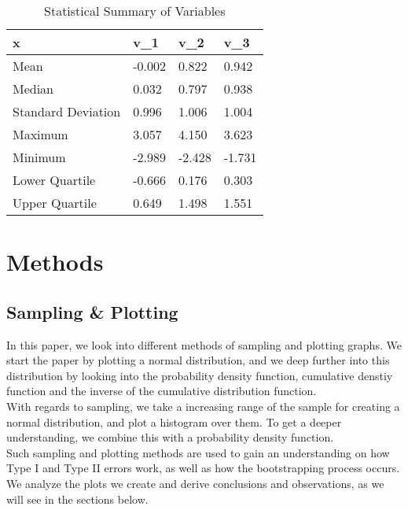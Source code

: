 \documentclass[a4paper,twocolumn]{article}
\begin{document}
\begin{table}[htbp]
    \centering
    \renewcommand{\arraystretch}{1.2} 
    \begin{tabular}{|l|p{1cm}|p{1cm}|p{1cm}|} 
        \hline
        \textbf{x} & \textbf{v\_1} & \textbf{v\_2} & \textbf{v\_3} \\
        \hline
        Mean                & -0.002  & 0.822  & 0.942  \\
        Median              & 0.032   & 0.797  & 0.938  \\
        Standard Deviation  & 0.996   & 1.006  & 1.004  \\
        Maximum             & 3.057   & 4.150  & 3.623  \\
        Minimum             & -2.989  & -2.428 & -1.731 \\
        Lower Quartile      & -0.666  & 0.176  & 0.303  \\
        Upper Quartile      & 0.649   & 1.498  & 1.551  \\
        \hline
    \end{tabular}
    \caption{Statistical Summary of Variables}
    \label{tab:summary}
\end{table}

\section{Methods}

\subsection{Sampling \& Plotting}
In this paper, we look into different methods of sampling and plotting graphs. We start the paper by plotting a 
normal distribution, and we deep further into this distribution by looking into the probability density function, 
cumulative denstiy function and the inverse of the cumulative distribution function. \\

With regards to sampling, we take a increasing range of the sample for creating a normal distribution, and plot 
a histogram over them. To get a deeper understanding, we combine this with a probability density function. \\

Such sampling and plotting methods are used to gain an understanding on how Type I and Type II errors work, as well
as how the bootstrapping process occurs. We analyze the plots we create and derive conclusions and observations, as 
we will see in the sections below. 
\end{document}
